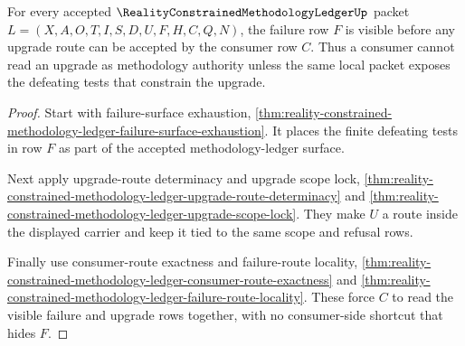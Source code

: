 \begin{theorem}
\label{thm:reality-constrained-methodology-ledger-failure-upgrade-triad}
For every accepted $\RealityConstrainedMethodologyLedgerUp$ packet
$L=(X,A,O,T,I,S,D,U,F,H,C,Q,N)$, the failure row $F$ is visible before any
upgrade route can be accepted by the consumer row $C$. Thus a consumer cannot
read an upgrade as methodology authority unless the same local packet exposes
the defeating tests that constrain the upgrade.
\end{theorem}
\begin{proof}
Start with failure-surface exhaustion,
\autoref{thm:reality-constrained-methodology-ledger-failure-surface-exhaustion}.
It places the finite defeating tests in row $F$ as part of the accepted
methodology-ledger surface.

Next apply upgrade-route determinacy and upgrade scope lock,
\autoref{thm:reality-constrained-methodology-ledger-upgrade-route-determinacy}
and
\autoref{thm:reality-constrained-methodology-ledger-upgrade-scope-lock}. They
make $U$ a route inside the displayed carrier and keep it tied to the same
scope and refusal rows.

Finally use consumer-route exactness and failure-route locality,
\autoref{thm:reality-constrained-methodology-ledger-consumer-route-exactness}
and
\autoref{thm:reality-constrained-methodology-ledger-failure-route-locality}.
These force $C$ to read the visible failure and upgrade rows together, with no
consumer-side shortcut that hides $F$.
\end{proof}


